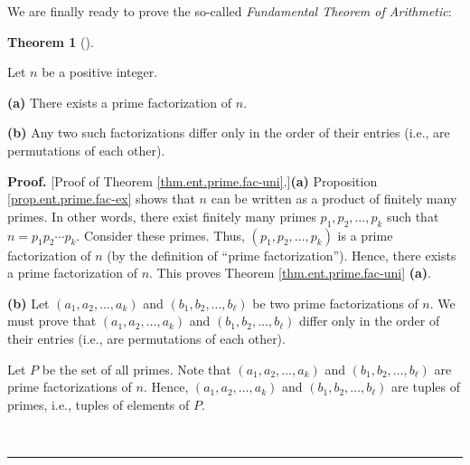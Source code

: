 \documentclass[numbers=enddot,12pt,final,onecolumn,notitlepage]{scrartcl}%
\numberwithin{exer}{subsection}
\theoremstyle{definition}
\newtheorem{theo}{Theorem}[subsection]
\newenvironment{theorem}[1][]
{\begin{theo}[#1]\begin{leftbar}}
{\end{leftbar}\end{theo}}
\newenvironment{proof}[1][Proof]{\noindent\textbf{#1.} }{\ \rule{0.5em}{0.5em}}
\begin{document}
We are finally ready to prove the so-called \textit{Fundamental Theorem of
Arithmetic}:

\begin{theorem}
\label{thm.ent.prime.fac-uni}Let $n$ be a positive integer.

\textbf{(a)} There exists a prime factorization of $n$.

\textbf{(b)} Any two such factorizations differ only in the order of their
entries (i.e., are permutations of each other).
\end{theorem}

\begin{proof}
[Proof of Theorem \ref{thm.ent.prime.fac-uni}.]\textbf{(a)} Proposition
\ref{prop.ent.prime.fac-ex} shows that $n$ can be written as a product of
finitely many primes. In other words, there exist finitely many primes
$p_{1},p_{2},\ldots,p_{k}$ such that $n=p_{1}p_{2}\cdots p_{k}$. Consider
these primes. Thus, $\left(  p_{1},p_{2},\ldots,p_{k}\right)  $ is a prime
factorization of $n$ (by the definition of \textquotedblleft prime
factorization\textquotedblright). Hence, there exists a prime factorization of
$n$. This proves Theorem \ref{thm.ent.prime.fac-uni} \textbf{(a)}.

\textbf{(b)} Let $\left(  a_{1},a_{2},\ldots,a_{k}\right)  $ and $\left(
b_{1},b_{2},\ldots,b_{\ell}\right)  $ be two prime factorizations of $n$. We
must prove that $\left(  a_{1},a_{2},\ldots,a_{k}\right)  $ and $\left(
b_{1},b_{2},\ldots,b_{\ell}\right)  $ differ only in the order of their
entries (i.e., are permutations of each other).

Let $P$ be the set of all primes. Note that $\left(  a_{1},a_{2},\ldots
,a_{k}\right)  $ and $\left(  b_{1},b_{2},\ldots,b_{\ell}\right)  $ are prime
factorizations of $n$. Hence, $\left(  a_{1},a_{2},\ldots,a_{k}\right)  $ and
$\left(  b_{1},b_{2},\ldots,b_{\ell}\right)  $ are tuples of primes, i.e.,
tuples of elements of $P$.


\end{proof}
\end{document}
